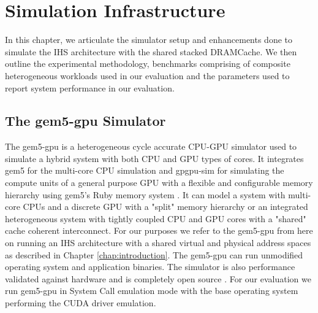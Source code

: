 \chapter{Simulation Infrastructure} \label{chap:simulator}
In this chapter, we articulate the simulator setup and enhancements done to simulate the IHS architecture with the shared stacked DRAMCache. We then outline the experimental methodology, benchmarks comprising of composite heterogeneous workloads used in our evaluation and the parameters used to report system performance in our evaluation.

\section{The gem5-gpu Simulator} \label{gem5-gpu-simulator}
The gem5-gpu \cite{gem5-gpu} is a heterogeneous cycle accurate CPU-GPU simulator used to simulate a hybrid system with both CPU and GPU types of cores. It integrates gem5 \cite{gem5} for the multi-core CPU simulation and gpgpu-sim \cite{gpgpu-sim} for simulating the compute units of a general purpose GPU with a flexible and configurable memory hierarchy using gem5's Ruby memory system \cite{gems}. It can model a system with multi-core CPUs and a discrete GPU with a "split" memory hierarchy or an integrated heterogeneous system with tightly coupled CPU and GPU cores with a "shared" cache coherent interconnect. For our purposes we refer to the gem5-gpu from here on running an IHS architecture with a shared virtual and physical address spaces as described in Chapter \ref{chap:introduction}. The gem5-gpu can run unmodified operating system and application binaries. The simulator is also performance validated against hardware and is completely open source \cite{gem5-gpu}. For our evaluation we run gem5-gpu in System Call emulation mode with the base operating system performing the CUDA driver emulation.

